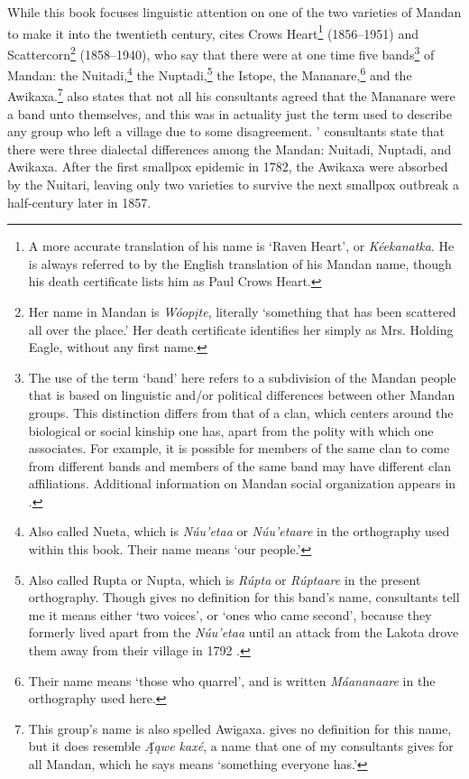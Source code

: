 While this book focuses linguistic attention on one of the two varieties of Mandan to make it into the twentieth century, \citet[24]{bowers1950} cites Crows Heart\footnote{A more accurate translation of his name is `Raven Heart', or \textit{Kéekanatka}. He is always referred to by the English translation of his Mandan name, though his death certificate lists him as Paul Crows Heart.} (1856--1951) and Scattercorn\footnote{Her name in Mandan is \textit{Wóopįte}, literally `something that has been scattered all over the place.' Her death certificate identifies her simply as Mrs. Holding Eagle, without any first name.} (1858--1940), who say that there were at one time five bands\footnote{The use of the term `band' here refers to a subdivision of the Mandan people that is based on linguistic and/or political differences between other Mandan groups. This distinction differs from that of a clan, which centers around the biological or social kinship one has, apart from the polity with which one associates. For example, it is possible for members of the same clan to come from different bands and members of the same band may have different clan affiliations. Additional information on Mandan social organization appears in \citet{bowers1950}.} of Mandan: the Nuitadi,\footnote{Also called Nueta, which is \textit{Núu'etaa} or \textit{Núu'etaare} in the orthography used within this book. Their name means `our people.'} the Nuptadi,\footnote{Also called Rupta or Nupta, which is \textit{Rúpta} or \textit{Rúptaare} in the present orthography. Though \citet[25]{bowers1950} gives no definition for this band's name, consultants tell me it means either `two voices', or `ones who came second', because they formerly lived apart from the \textit{Núu'etaa} until an attack from the Lakota drove them away from their village in 1792 \citep[116]{bowers1950}.} the Istope, the Mananare,\footnote{Their name means `those who quarrel', and is written \textit{Máananaare} in the orthography used here.} and the Awikaxa.\footnote{This group's name is also spelled Awigaxa. \citet[25]{bowers1950} gives no definition for this name, but it does resemble \textit{Ą́ąwe kaxé}, a name that one of my consultants gives for all Mandan, which he says means `something everyone has.'} \citeauthor{bowers1950} also states that not all his consultants agreed that the Mananare were a band unto themselves, and this was in actuality just the term used to describe any group who left a village due to some disagreement. \citeauthor{bowers1950}' consultants state that there were three dialectal differences among the Mandan: Nuitadi, Nuptadi, and Awikaxa. After the first smallpox epidemic in 1782, the Awikaxa were absorbed by the Nuitari, leaving only two varieties to survive the next smallpox outbreak a half-century later in 1857.

